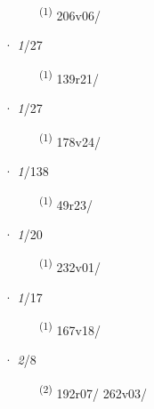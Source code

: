 \begin{description}
    \item[]  \textsuperscript{(1)} \mbox{206v06/}
\end{description}
\ENTRYEND
\noindent{} · \textit{1}/27 \LEMMALINE
\begin{description}
    \item[]  \textsuperscript{(1)} \mbox{139r21/}
\end{description}
\ENTRYEND
\noindent{} · \textit{1}/27 \LEMMALINE
\begin{description}
    \item[]  \textsuperscript{(1)} \mbox{178v24/}
\end{description}
\ENTRYEND
\noindent{} · \textit{1}/138 \LEMMALINE
\begin{description}
    \item[]  \textsuperscript{(1)} \mbox{49r23/}
\end{description}
\ENTRYEND
\noindent{} · \textit{1}/20 \LEMMALINE
\begin{description}
    \item[]  \textsuperscript{(1)} \mbox{232v01/}
\end{description}
\ENTRYEND
\noindent{} · \textit{1}/17 \LEMMALINE
\begin{description}
    \item[]  \textsuperscript{(1)} \mbox{167v18/}
\end{description}
\ENTRYEND
\noindent{} · \textit{2}/8 \LEMMALINE
\begin{description}
    \item[]  \textsuperscript{(2)} \mbox{192r07/} \mbox{262v03/}
\end{description}

